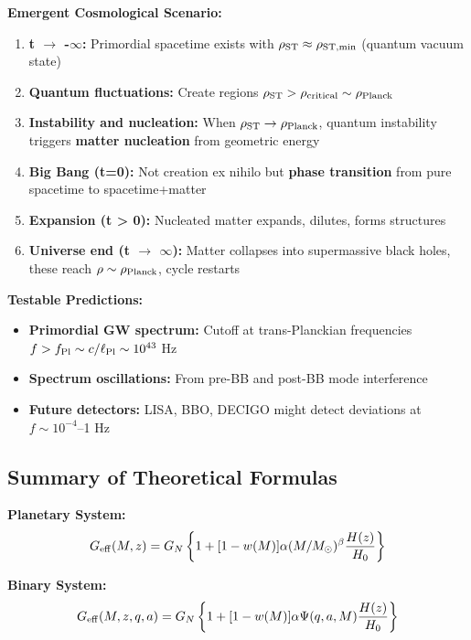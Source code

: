 \documentclass[10pt,a4paper]{article}
\providecommand{\tightlist}{\setlength{\itemsep}{0pt}\setlength{\parskip}{0pt}}
\begin{document}
\textbf{Emergent Cosmological Scenario:}

\begin{enumerate}
\def\labelenumi{\arabic{enumi}.}
\item
  \textbf{t $\rightarrow$ -$\infty$:} Primordial spacetime exists with
  \(\rho_{\rm ST} \approx \rho_{\rm ST,min}\) (quantum vacuum state)
\item
  \textbf{Quantum fluctuations:} Create regions
  \(\rho_{\rm ST} > \rho_{\rm critical} \sim \rho_{\rm Planck}\)
\item
  \textbf{Instability and nucleation:} When
  \(\rho_{\rm ST} \to \rho_{\rm Planck}\), quantum instability triggers
  \textbf{matter nucleation} from geometric energy
\item
  \textbf{Big Bang (t=0):} Not creation ex nihilo but \textbf{phase
  transition} from pure spacetime to spacetime+matter
\item
  \textbf{Expansion (t \textgreater{} 0):} Nucleated matter expands,
  dilutes, forms structures
\item
  \textbf{Universe end (t $\rightarrow$ $\infty$):} Matter collapses into supermassive
  black holes, these reach \(\rho \sim \rho_{\rm Planck}\), cycle
  restarts
\end{enumerate}

\textbf{Testable Predictions:}

\begin{itemize}
\tightlist
\item
  \textbf{Primordial GW spectrum:} Cutoff at trans-Planckian frequencies
  \(f > f_{\rm Pl} \sim c/\ell_{\rm Pl} \sim 10^{43}\) Hz
\item
  \textbf{Spectrum oscillations:} From pre-BB and post-BB mode
  interference
\item
  \textbf{Future detectors:} LISA, BBO, DECIGO might detect deviations
  at \(f \sim 10^{-4}\)--1 Hz
\end{itemize}

\subsection{Summary of Theoretical
Formulas}\label{summary-of-theoretical-formulas}

\textbf{Planetary System:}
\[G_{\rm eff}(M,z) = G_N \left\{1 + [1-w(M)] \alpha (M/M_\odot)^\beta \frac{H(z)}{H_0}\right\}\]

\textbf{Binary System:}
\[G_{\rm eff}(M,z,q,a) = G_N \left\{1 + [1-w(M)] \alpha \Psi(q,a,M) \frac{H(z)}{H_0}\right\}\]
\end{document}
